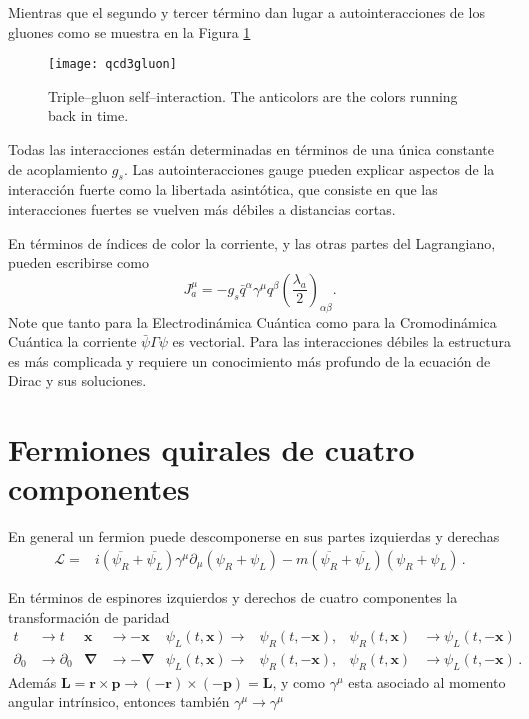 Mientras que el segundo y tercer término dan lugar a autointeracciones de los gluones como se muestra en la Figura \ref{fig:qcd3gluon}
\begin{figure}
  \centering
  \texttt{[image: qcd3gluon]}%
  \caption{Triple--gluon self--interaction. The anticolors are the colors running back in time.}
  \label{fig:qcd3gluon}
\end{figure}


Todas las interacciones están determinadas en términos de una única constante de acoplamiento $g_s$. Las autointeracciones gauge pueden explicar aspectos de la interacción fuerte como la libertada asintótica, que consiste en que las interacciones fuertes se vuelven más débiles a distancias cortas. 

En términos de índices de color la corriente, y las otras partes del Lagrangiano, pueden escribirse como
\begin{equation}
  \label{eq:223qft}
  J^\mu_a=-g_s\bar{q}^\alpha\gamma^\mu q^\beta\left(\frac{\lambda_a}{2}\right)_{\alpha\beta}.
\end{equation}
Note que tanto para la Electrodinámica Cuántica como para la Cromodinámica Cuántica la corriente $\bar{\psi}\Gamma\psi$ es vectorial. Para las interacciones débiles la estructura es más complicada y requiere un conocimiento más profundo de la ecuación de Dirac y sus soluciones.


\section{Fermiones quirales de cuatro componentes}
\label{sec:ferm-quir-de}
En general un fermion puede descomponerse en sus partes izquierdas y derechas
\begin{align}
  \mathcal{L}  =&i \left(\overline{\psi_R}+\overline{\psi_L}  \right)\gamma^\mu\partial_\mu \left(\psi_R+\psi_L\right)-m\left(\overline{\psi_R}+\overline{\psi_L}  \right)\left(\psi_R+\psi_L\right)\,.
\end{align}



En términos de espinores izquierdos y derechos de cuatro componentes la transformación de paridad 
\begin{align}
  \label{eq:220qft}
  t&\to t&\mathbf{x}&\to -\mathbf{x}&\psi_L(t,\mathbf{x})\to&\psi_R(t,-\mathbf{x}),& \psi_R(t,\mathbf{x})&\to\psi_L(t,-\mathbf{x})\nonumber\\
  \partial_0&\to \partial_0&\boldsymbol{\nabla}&\to -\boldsymbol{\nabla}&\psi_L(t,\mathbf{x})\to&\psi_R(t,-\mathbf{x}),& \psi_R(t,\mathbf{x})&\to\psi_L(t,-\mathbf{x})\,.
\end{align}
Además $\mathbf{L}=\mathbf{r}\times \mathbf{p}\to(-\mathbf{r})\times (-\mathbf{p})=\mathbf{L}$, y como $\gamma^\mu$ esta asociado al momento angular intrínsico, entonces también $\gamma^\mu\to\gamma^\mu$


